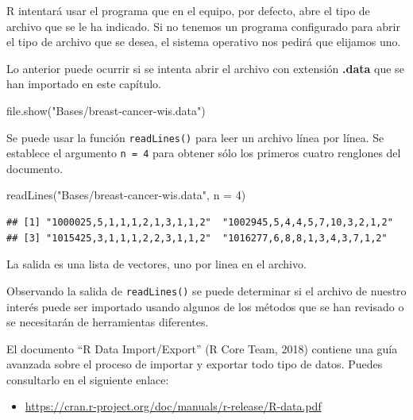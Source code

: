 \documentclass[
]{book}
\newenvironment{Shaded}{\begin{snugshade}}{\end{snugshade}}
\newcommand{\AttributeTok}[1]{\textcolor[rgb]{0.77,0.63,0.00}{#1}}
\newcommand{\DecValTok}[1]{\textcolor[rgb]{0.00,0.00,0.81}{#1}}
\newcommand{\FunctionTok}[1]{\textcolor[rgb]{0.00,0.00,0.00}{#1}}
\newcommand{\NormalTok}[1]{#1}
\newcommand{\StringTok}[1]{\textcolor[rgb]{0.31,0.60,0.02}{#1}}
\providecommand{\tightlist}{%
  \setlength{\itemsep}{0pt}\setlength{\parskip}{0pt}}
\begin{document}
R intentará usar el programa que en el equipo, por defecto, abre el tipo de archivo que se le ha indicado. Si no tenemos un programa configurado para abrir el tipo de archivo que se desea, el sistema operativo nos pedirá que elijamos uno.

Lo anterior puede ocurrir si se intenta abrir el archivo con extensión \textbf{.data} que se han importado en este capítulo.

\begin{Shaded}
\begin{Highlighting}[]
\FunctionTok{file.show}\NormalTok{(}\StringTok{"Bases/breast{-}cancer{-}wis.data"}\NormalTok{)}
\end{Highlighting}
\end{Shaded}

Se puede usar la función \texttt{readLines()} para leer un archivo línea por línea. Se establece el argumento \texttt{n\ =\ 4} para obtener sólo los primeros cuatro renglones del documento.

\begin{Shaded}
\begin{Highlighting}[]
\FunctionTok{readLines}\NormalTok{(}\StringTok{"Bases/breast{-}cancer{-}wis.data"}\NormalTok{, }\AttributeTok{n =} \DecValTok{4}\NormalTok{)}
\end{Highlighting}
\end{Shaded}

\begin{verbatim}
## [1] "1000025,5,1,1,1,2,1,3,1,1,2"  "1002945,5,4,4,5,7,10,3,2,1,2"
## [3] "1015425,3,1,1,1,2,2,3,1,1,2"  "1016277,6,8,8,1,3,4,3,7,1,2"
\end{verbatim}

La salida es una lista de vectores, uno por linea en el archivo.

Observando la salida de \texttt{readLines()} se puede determinar si el archivo de nuestro interés puede ser importado usando algunos de los métodos que se han revisado o se necesitarán de herramientas diferentes.

El documento ``R Data Import/Export'' (R Core Team, 2018) contiene una guía avanzada sobre el proceso de importar y exportar todo tipo de datos. Puedes consultarlo en el siguiente enlace:

\begin{itemize}
\tightlist
\item
  \url{https://cran.r-project.org/doc/manuals/r-release/R-data.pdf}
\end{itemize}
\end{document}
